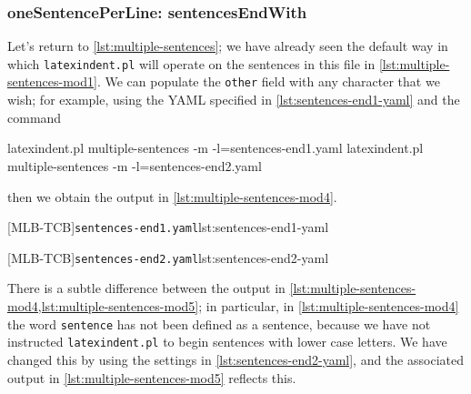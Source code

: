 \documentclass[10pt]{article}
\begin{document}
\subsubsection{oneSentencePerLine: sentencesEndWith}
 \begin{example}
 Let's return to \vref{lst:multiple-sentences}; we have already seen the default way in
 which \texttt{latexindent.pl} will operate on the sentences in this file in
 \vref{lst:multiple-sentences-mod1}. We can populate the \texttt{other} field with any
 character that we wish; for example, using the YAML specified in
 \cref{lst:sentences-end1-yaml} and the command 
  

 \begin{commandshell}
latexindent.pl multiple-sentences -m -l=sentences-end1.yaml
latexindent.pl multiple-sentences -m -l=sentences-end2.yaml
\end{commandshell}

 then we obtain the output in \cref{lst:multiple-sentences-mod4}. 

 \begin{cmhtcbraster}
  [MLB-TCB]{\texttt{sentences-end1.yaml}}{lst:sentences-end1-yaml}
 \end{cmhtcbraster}

 \begin{cmhtcbraster}
  [MLB-TCB]{\texttt{sentences-end2.yaml}}{lst:sentences-end2-yaml}
 \end{cmhtcbraster}

 There is a subtle difference between the output in
 \cref{lst:multiple-sentences-mod4,lst:multiple-sentences-mod5}; in particular, in
 \cref{lst:multiple-sentences-mod4} the word \texttt{sentence} has not been defined as a
 sentence, because we have not instructed \texttt{latexindent.pl} to begin sentences with
 lower case letters. We have changed this by using the settings in
 \cref{lst:sentences-end2-yaml}, and the associated output in
 \cref{lst:multiple-sentences-mod5} reflects this.
 \end{example}
\end{document}
